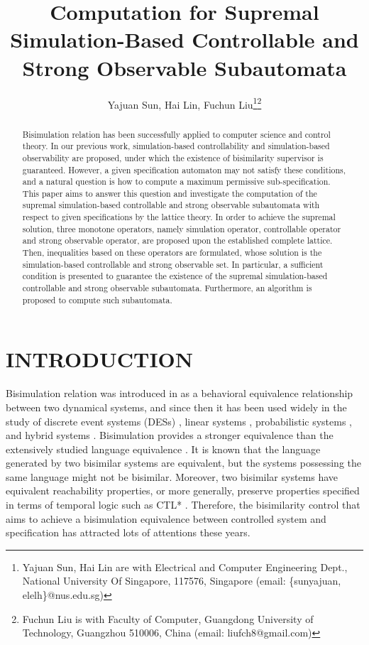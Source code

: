 \documentclass[12pt,draftcls,onecolumn]{IEEEtran}
\title{\LARGE \bf
Computation for Supremal Simulation-Based Controllable and Strong
Observable Subautomata }
\author{Yajuan Sun, Hai Lin, Fuchun Liu\thanks{Yajuan Sun, Hai Lin are with Electrical and Computer Engineering Dept., National
University Of Singapore, 117576, Singapore (email: \{sunyajuan, elelh\}@nus.edu.sg)}\thanks{Fuchun Liu is with Faculty of Computer, Guangdong University of Technology, Guangzhou 510006, China (email: liufch8@gmail.com)}}
\begin{document}
\maketitle
\thispagestyle{empty}




\begin{abstract}
Bisimulation relation has been successfully applied to computer
science and control theory. In our previous work, simulation-based
controllability and simulation-based observability are proposed,
under which the existence of bisimilarity supervisor is
guaranteed. However, a given specification automaton may not
satisfy these conditions, and a natural question is how to compute
a maximum permissive sub-specification. This paper aims to answer
this question and investigate the computation of the supremal
simulation-based controllable and strong observable subautomata
with respect to given specifications by the lattice theory. In
order to achieve the supremal solution, three monotone operators,
namely simulation operator, controllable operator and strong
observable operator, are proposed upon the established complete
lattice. Then, inequalities based on these operators are
formulated, whose solution is the simulation-based controllable
and strong observable set. In particular, a sufficient condition
is presented to guarantee the existence of the supremal
simulation-based controllable and strong observable subautomata.
Furthermore, an algorithm is proposed to compute such subautomata.
\end{abstract}





\section{INTRODUCTION}
Bisimulation relation was introduced in \cite{milner} as a
behavioral equivalence relationship between two dynamical systems,
and since then it has been used widely in the study of discrete
event systems (DESs) \cite{f}, linear systems \cite{pa},
probabilistic systems \cite{pro}, and hybrid systems \cite{hyb}.
Bisimulation provides a stronger equivalence than the extensively
studied language equivalence \cite{cc}. It is known that the
language generated by two bisimilar systems are equivalent, but
the systems possessing the same language might not be bisimilar.
Moreover, two bisimilar systems have equivalent reachability
properties, or more generally, preserve properties specified in
terms of temporal logic such as CTL* \cite{tl}. Therefore, the
bisimilarity control that aims to achieve a bisimulation
equivalence between controlled system and specification has
attracted lots of attentions these years.
\end{document}
